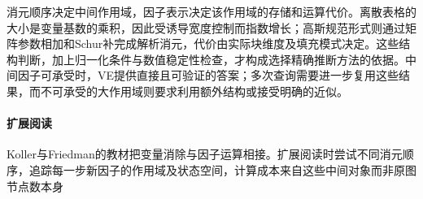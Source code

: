 消元顺序决定中间作用域，因子表示决定该作用域的存储和运算代价。离散表格的大小是变量基数的乘积，因此受诱导宽度控制而指数增长；高斯规范形式则通过矩阵参数相加和Schur补完成解析消元，代价由实际块维度及填充模式决定。这些结构判断，加上归一化条件与数值稳定性检查，才构成选择精确推断方法的依据。中间因子可承受时，VE提供直接且可验证的答案；多次查询需要进一步复用这些结果，而不可承受的大作用域则要求利用额外结构或接受明确的近似。

\paragraph{扩展阅读}
Koller与Friedman的教材把变量消除与因子运算相接。扩展阅读时尝试不同消元顺序，追踪每一步新因子的作用域及状态空间，计算成本来自这些中间对象而非原图节点数本身
